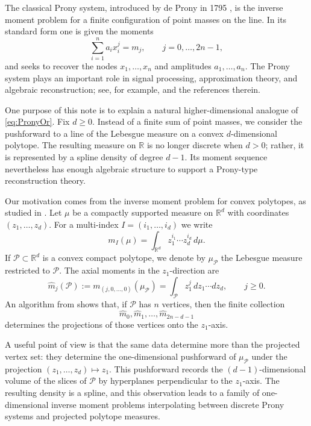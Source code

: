 \documentclass[reqno]{amsart}
\numberwithin{theorem}{section}
\newcommand{\RR}{\mathbb{R}}
\newcommand{\cP}{\mathcal{P}}
\begin{document}
The classical Prony system, introduced by de Prony in 1795 \cite{Pr}, is the inverse moment problem for a finite configuration of point masses on the line. In its standard form one is given the moments
\begin{equation}\label{eq:PronyOr}
\sum_{i=1}^n a_i x_i^j = m_j, \qquad j=0,\dots,2n-1,
\end{equation}
and seeks to recover the nodes $x_1,\dots,x_n$ and amplitudes $a_1,\dots,a_n$.
The Prony system plays an important role in signal processing, approximation theory, and algebraic reconstruction; see, for example, \cite{GSY} and the references therein.

One purpose of this note is to explain a natural higher-dimensional analogue of \eqref{eq:PronyOr}. Fix $d\geq 0$. Instead of a finite sum of point masses, we consider the pushforward to a line of the Lebesgue measure on a convex $d$-dimensional polytope. The resulting measure on $\RR$ is no longer discrete when $d>0$; rather, it is represented by a spline density of degree $d-1$. Its moment sequence nevertheless has enough algebraic structure to support a Prony-type reconstruction theory.

Our motivation comes from the inverse moment problem for convex polytopes, as studied in \cite{GLPR,GPSS}. Let $\mu$ be a compactly supported measure on $\RR^d$ with coordinates $(z_1,\dots,z_d)$. For a multi-index $I=(i_1,\dots,i_d)$ we write
\[
m_I(\mu)=\int_{\RR^d} z_1^{i_1}\cdots z_d^{i_d}\,d\mu.
\]
If $\cP\subset\RR^d$ is a convex compact polytope, we denote by $\mu_{\cP}$ the Lebesgue measure restricted to $\cP$. The axial moments in the $z_1$-direction are
\[
\widehat m_j(\cP):=m_{(j,0,\dots,0)}(\mu_{\cP})=\int_{\cP} z_1^j\,dz_1\cdots dz_d, \qquad j\ge 0.
\]
An algorithm from \cite{GLPR} shows that, if $\cP$ has $n$ vertices, then the finite collection
\[
\widehat m_0,\widehat m_1,\dots,\widehat m_{2n-d-1}
\]
determines the projections of those vertices onto the $z_1$-axis.

A useful point of view is that the same data determine more than the projected vertex set: they determine the one-dimensional pushforward of $\mu_{\cP}$ under the projection $(z_1,\dots,z_d)\mapsto z_1$. This pushforward records the $(d-1)$-dimensional volume of the slices of $\cP$ by hyperplanes perpendicular to the $z_1$-axis. The resulting density is a spline, and this observation leads to a family of one-dimensional inverse moment problems interpolating between discrete Prony systems and projected polytope measures.
\end{document}
